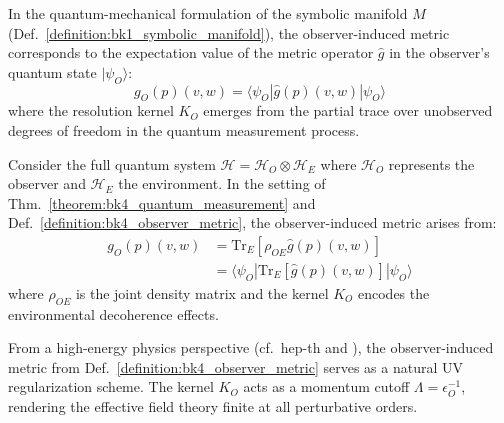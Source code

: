 \begin{theorem}\label{theorem:bk4_quantum_measurement}
In the quantum-mechanical formulation of the symbolic manifold $M$ (Def.~\ref{definition:bk1_symbolic_manifold}), the observer-induced metric corresponds to the expectation value of the metric operator $\hat{g}$ in the observer's quantum state $|\psi_O\rangle$:
\begin{equation}
    g_O(p)(v,w) = \langle \psi_O | \hat{g}(p)(v,w) | \psi_O \rangle
\end{equation}
where the resolution kernel $K_O$ emerges from the partial trace over unobserved degrees of freedom in the quantum measurement process.
\end{theorem}

\begin{demonstratio}
\label{demonstratio:bk4_quantum_measurement}
Consider the full quantum system $\mathcal{H} = \mathcal{H}_O \otimes \mathcal{H}_E$ where $\mathcal{H}_O$ represents the observer and $\mathcal{H}_E$ the environment. In the setting of Thm.~\ref{theorem:bk4_quantum_measurement} and Def.~\ref{definition:bk4_observer_metric}, the observer-induced metric arises from:
\begin{align}
    g_O(p)(v,w) &= \text{Tr}_E[\rho_{OE} \hat{g}(p)(v,w)] \\
    &= \langle \psi_O | \text{Tr}_E[\hat{g}(p)(v,w)] | \psi_O \rangle
\end{align}
where $\rho_{OE}$ is the joint density matrix and the kernel $K_O$ encodes the environmental decoherence effects.
\end{demonstratio}

\begin{proposition}\label{proposition:bk4_field_regularization}
From a high-energy physics perspective (cf.~hep-th and \cite{zinn2002quantum}),
the observer-induced metric from Def.~\ref{definition:bk4_observer_metric}
serves as a natural UV regularization scheme.
The kernel $K_O$ acts as a momentum cutoff $\Lambda = \epsilon_O^{-1}$, rendering the effective field theory finite at all perturbative orders.
\end{proposition}

